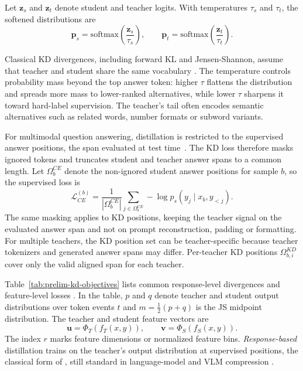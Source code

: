 Let \(\mathbf{z}_s\) and \(\mathbf{z}_t\) denote student and teacher logits.
With temperatures \(\tau_s\) and \(\tau_t\), the softened distributions are
\begin{equation}
\mathbf{p}_s = \mathrm{softmax}\!\left(\frac{\mathbf{z}_s}{\tau_s}\right),
\qquad
\mathbf{p}_t = \mathrm{softmax}\!\left(\frac{\mathbf{z}_t}{\tau_t}\right).
\end{equation}

Classical KD divergences, including forward KL and Jensen-Shannon, assume that
teacher and student share the same vocabulary
\cite{hinton2015distillingknowledgeneuralnetwork,lin1991jensen,boizard2024towardscrosstokenizerdistillation}.
The temperature controls probability mass beyond the top answer token: higher \(\tau\) flattens the distribution and spreads more mass to
lower-ranked alternatives, while lower \(\tau\) sharpens it toward hard-label
supervision. The teacher's tail often encodes semantic alternatives such as
related words, number formats or subword variants.

For multimodal question answering, distillation is restricted to the
supervised answer positions, the span evaluated at test
time~\cite{liu2023visualinstructiontuning}.
The KD loss therefore masks ignored tokens and truncates student and teacher
answer spans to a common length.
Let \(\Omega_b^{CE}\) denote the non-ignored student answer positions for
sample \(b\), so the supervised loss is
\begin{equation}
\mathcal{L}_{CE}^{(b)}
=
\frac{1}{|\Omega_b^{CE}|}
\sum_{j\in\Omega_b^{CE}}
-\log p_s(y_j\mid x_b,y_{<j}).
\end{equation}
The same masking applies to KD positions, keeping the teacher signal on the
evaluated answer span and not on prompt reconstruction, padding or formatting.
For multiple teachers, the KD position set can be teacher-specific because
teacher tokenizers and generated answer spans may differ. Per-teacher KD positions \(\Omega_{b,i}^{KD}\) cover only the valid aligned
span for each teacher.

Table~\ref{tab:prelim-kd-objectives} lists common response-level divergences
and feature-level losses
\cite{hinton2015distillingknowledgeneuralnetwork,lin1991jensen}. In the
table, \(p\) and \(q\) denote teacher and student output distributions over
token events \(t\) and \(m=\frac{1}{2}(p+q)\) is the JS midpoint distribution.
The teacher and student feature vectors are
\[
\mathbf{u}=\Phi_T(f_T(x,y)),
\qquad
\mathbf{v}=\Phi_S(f_S(x,y)).
\]
The index \(r\) marks feature dimensions or normalized feature bins.
\textit{Response-based} distillation trains on the teacher's output distribution
at supervised positions, the classical form of
\cite{hinton2015distillingknowledgeneuralnetwork}, still standard in
language-model and VLM compression
\cite{xu2024surveyknowledgedistillationlarge,fang2021compressingvlm}.


